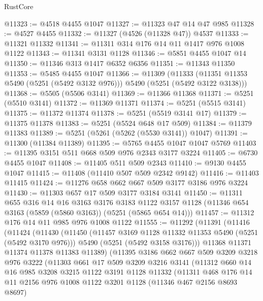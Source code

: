 \begin{lexlean}{RustCore}
\begin{coremodule}
@11323 := @4518 @4455 @1047
@11327 := @11323 @47 @14 @47 @985
@11328 := @4527 @4455
@11332 := @11327 (@4526 (@11328 @47)) @4537
@11333 := @11321 @11332
@11341 := @11311 @314 @176 @14 @11 @1417 @976 @1008 @1122
@11343 := @11341 @3131 @1128
@11346 := @5851 @4455 @1047 @14
@11350 := @11346 @313 @1417 @6352 @6356
@11351 := @11343 @11350
@11353 := @5485 @4455 @1047
@11366 := @11309
    (@11333 (@11351 @11353 @5490 (@5251 (@5492 @3132 @976))) @5490 (@5251 (@5492 @3122 @3138)))
@11368 := @5505 (@5506 @3141)
@11369 := @11366 @11368
@11371 := @5251 (@5510 @3141)
@11372 := @11369 @11371
@11374 := @5251 (@5515 @3141)
@11375 := @11372 @11374
@11378 := @5251 (@5519 @3141 @17)
@11379 := @11375 @11378
@11383 := @5251 (@5524 @648 @17 @509)
@11384 := @11379 @11383
@11389 := @5251 (@5261 (@5262 (@5530 @3141)) @1047)
@11391 := @11300 (@11384 @11389)
@11395 := @5765 @4455 @1047 @1047 @5769
@11403 := @11395 @3151 @511 @668 @509 @976 @2343 @3177 @3224
@11405 := @6730 @4455 @1047
@11408 := @11405 @511 @509 @2343
@11410 := @9130 @4455 @1047
@11415 := @11408 (@11410 @507 @509 @2342 @9142)
@11416 := @11403 @11415
@11424 := @11276 @658 @662 @667 @509 @3177 @3186 @976 @3224
@11430 := @11303 @657 @17 @509 @3177 @3184 @3141
@11450 := @11311
    @655
    @316
    @14
    @16
    @3163
    @3176
    @3183
    @1122
    @3157
    @1128
    (@11346 @654 @3163 (@5859 (@5860 @3163)) (@5251 (@5865 @654 @14)))
@11457 := @11312 @176 @14 @11 @985 @976 @1008 @1122
@11555 := @11292
    (@11391
      (@11416
        (@11424
          (@11430
            (@11450
              (@11457 @3169 @1128 @11332 @11353 @5490 (@5251 (@5492 @3170 @976)))
              @5490
              (@5251 (@5492 @3158 @3176)))
            @11368
            @11371
            @11374
            @11378
            @11383
            @11389)
          (@11395
            @3186
            @662
            @667
            @509
            @3209
            @3218
            @976
            @3222
            (@11303
              @661
              @17
              @509
              @3209
              @3216
              @3141
              (@11312
                @660
                @14
                @16
                @985
                @3208
                @3215
                @1122
                @3191
                @1128
                @11332
                (@11311
                  @468
                  @176
                  @14
                  @11
                  @2156
                  @976
                  @1008
                  @1122
                  @3201
                  @1128
                  (@11346 @467 @2156 @8693 @8697)

\end{coremodule}
\end{lexlean}
